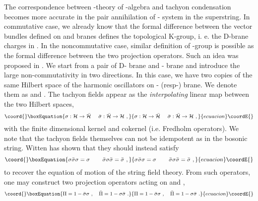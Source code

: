 \documentclass[a4paper,12pt]{article}
\begin{document}
The correspondence between \coordHE{}-theory of
\coordHE{}-algebra and tachyon condensation becomes more accurate
in the pair annihilation of \coordHE{}-\coordHE{} 
system in the superstring.
In commutative case, we already know
\cite{r:Witten2} that the formal difference between the 
vector bundles defined on \coordHE{} and \coordHE{} branes defines
the topological K-group, i. e. the D-brane charges in \coordHE{}.
In the noncommutative case, similar definition of
\coordHE{}-group is possible as the formal difference
between the  two projection operators.
Such an idea was proposed in \cite{r:Witten}.
We start from  a pair of D-\coordHE{} brane and
\coordHE{}-\coordHE{} brane and introduce the large
non-commutativity in two directions.
In this case, we have two copies of
the same Hilbert space of the harmonic oscillators 
on \coordHE{}- (resp\coordHE{}-) brane. We denote them as \myHighlight{$\cH$}\coordHE{} and \myHighlight{$\bar\cH$}\coordHE{}.
The tachyon fields \myHighlight{$\sigma,\bar\sigma$}\coordHE{} 
appear as the {\em interpolating} 
linear map between the two Hilbert spaces,
\begin{equation}\coord{}\boxEquation{
 \sigma : \cH \rightarrow \bar\cH\,\,\quad
 \bar\sigma : \bar\cH \rightarrow \cH\,\,,
}{
 \sigma : \cH \rightarrow \bar\cH\,\,\quad
 \bar\sigma : \bar\cH \rightarrow \cH\,\,,
}{ecuacion}\coordE{}\end{equation}
with the finite dimensional kernel and cokernel
(i.e. Fredholm operators).
We note that the tachyon fields themselves can not
be idempotent as in the bosonic string. Witten \cite{r:Witten}
has shown that they should instead satisfy
\begin{equation}\coord{}\boxEquation{
 \sigma \bar\sigma \sigma=\sigma\,\qquad
 \bar\sigma \sigma \bar\sigma = \bar\sigma\,\,,
}{
 \sigma \bar\sigma \sigma=\sigma\,\qquad
 \bar\sigma \sigma \bar\sigma = \bar\sigma\,\,,
}{ecuacion}\coordE{}\end{equation}
to recover the equation of motion of the 
string field theory.  
{}From such operators, one may construct two projection operators
acting on \myHighlight{$\cH$}\coordHE{} and \myHighlight{$\bar\cH$}\coordHE{},
\begin{equation}\coord{}\boxEquation{
 \Pi=1-\bar\sigma\sigma\,\,,\quad
 \bar\Pi=1-\sigma\bar\sigma\,\,.
}{
 \Pi=1-\bar\sigma\sigma\,\,,\quad
 \bar\Pi=1-\sigma\bar\sigma\,\,.
}{ecuacion}\coordE{}\end{equation}
\end{document}

